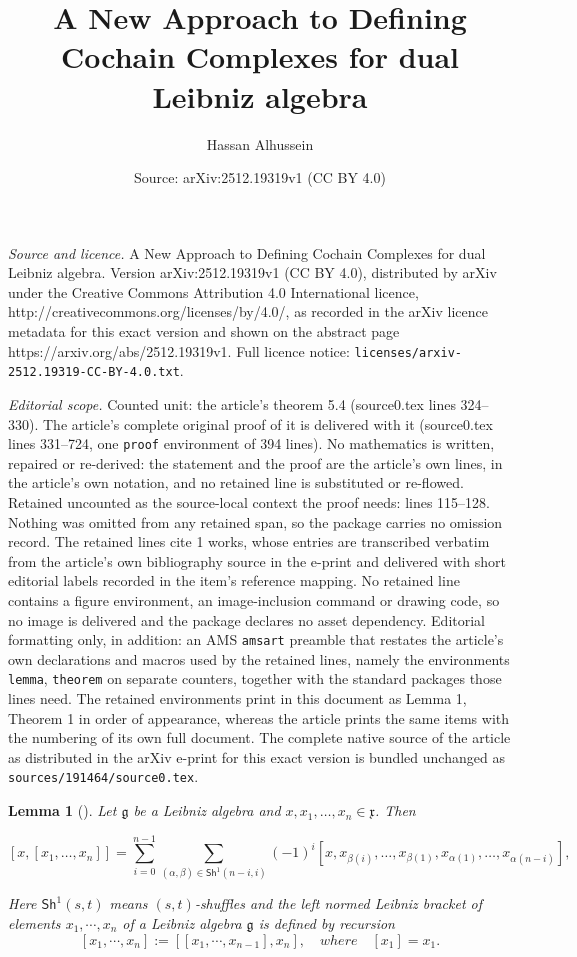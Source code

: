 \documentclass[10pt,a4paper]{amsart}
\title{A New Approach to Defining Cochain Complexes for dual Leibniz algebra}
\author{Hassan Alhussein}
\date{Source: arXiv:2512.19319v1 (CC BY 4.0)}
\newtheorem{lemma}{Lemma}
\begin{document}
\maketitle

\noindent\emph{Source and licence.} A New Approach to Defining Cochain Complexes for dual Leibniz algebra. Version arXiv:2512.19319v1 (CC BY 4.0), distributed by arXiv under the Creative Commons Attribution 4.0 International licence, http://creativecommons.org/licenses/by/4.0/, as recorded in the arXiv licence metadata for this exact version and shown on the abstract page https://arxiv.org/abs/2512.19319v1. Full licence notice: \texttt{licenses/arxiv-2512.19319-CC-BY-4.0.txt}.\par\smallskip

\noindent\textit{Editorial scope.} Counted unit: the article's theorem 5.4 (source0.tex lines 324--330). The article's complete original proof of it is delivered with it (source0.tex lines 331--724, one \texttt{proof} environment of 394 lines). No mathematics is written, repaired or re-derived: the statement and the proof are the article's own lines, in the article's own notation, and no retained line is substituted or re-flowed.  Retained uncounted as the source-local context the proof needs: lines 115--128.  Nothing was omitted from any retained span, so the package carries no omission record.  The retained lines cite 1 works, whose entries are transcribed verbatim from the article's own bibliography source in the e-print and delivered with short editorial labels recorded in the item's reference mapping.  No retained line contains a figure environment, an image-inclusion command or drawing code, so no image is delivered and the package declares no asset dependency.  Editorial formatting only, in addition: an AMS \texttt{amsart} preamble that restates the article's own declarations and macros used by the retained lines, namely the environments \texttt{lemma}, \texttt{theorem} on separate counters, together with the standard packages those lines need.  The retained environments print in this document as Lemma 1, Theorem 1 in order of appearance, whereas the article prints the same items with the numbering of its own full document.  The complete native source of the article as distributed in the arXiv e-print for this exact version is bundled unchanged as \texttt{sources/191464/source0.tex}.
\begin{lemma}[\cite{I.S}]\label{lem}
  Let \(\mathfrak{g}\) be a Leibniz algebra and \(x, x_1, \dots, x_n \in \mathfrak{x}\). Then

\[
[x, [x_1, \dots, x_n]] = \sum_{i=0}^{n-1} \sum_{(\alpha,\beta) \in \mathsf{Sh}^1(n-i,i)} (-1)^i [x, x_{\beta(i)}, \dots, x_{\beta(1)}, x_{\alpha(1)}, \dots, x_{\alpha(n-i)}],
\]


Here \(\mathsf{Sh}^1(s,t)\) means \((s,t)\)-shuffles  and the left normed Leibniz  bracket of elements $x_1,\cdots,x_n$ of a Leibniz algebra  \(\mathfrak{g}\) is defined by recursion
\[
[x_1,\cdots,x_n] := [[x_1,\cdots,x_{n-1}], x_n],\quad where\quad [x_1] =x_1.
\]
  
\end{lemma}
\end{document}
